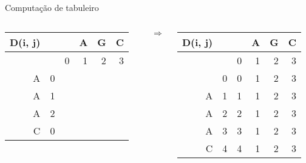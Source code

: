 \begin{frame}{Computação de tabuleiro}

\begin{columns}

  \begin{column}{0.45\textwidth}
      \begin{tabular}{||r|r||r|r|r|r||}\hline\hline
    D(i, j) & & & A & G & C \\\hline
            & &0& 1 & 2 & 3 \\\hline\hline 
          A & 0 & &  &  &  \\\hline
          A & 1 & &  &  &  \\\hline
          A & 2 & &  &  &  \\\hline
          C & 0 & &  &  &  \\\hline
  \end{tabular}
\end{column}

$\Rightarrow$

  \begin{column}{0.45\textwidth}
      \begin{tabular}{||r|r||r|r|r|r||}\hline\hline
    D(i, j) &   &  & A & G & C \\\hline
            &   & 0& 1 & 2 & 3 \\\hline\hline 
            & 0 & 0& 1 & 2 & 3 \\\hline
          A & 1 & 1 & 1 & 2 & 3 \\\hline
          A & 2 & 2 & 1 & 2 & 3 \\\hline
          A & 3 & 3 & 1 & 2 & 3 \\\hline
          C & 4 & 4 & 1 & 2 & 3 \\\hline
  \end{tabular}

  \end{column}

  \end{columns}
  
\end{frame}

